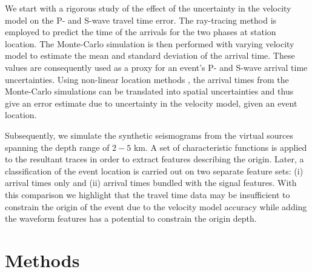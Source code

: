 \documentclass[letterpaper,11pt]{article}
\begin{document}
We start with a rigorous study of the effect of the uncertainty in the velocity model on the P- and S-wave travel time error. The ray-tracing method is employed to predict the time of the arrivals for the two phases at station location. The Monte-Carlo simulation is then performed with varying velocity model to estimate the mean and standard deviation of the arrival time. These values are consequently used as a proxy for an event's P- and S-wave arrival time uncertainties. Using non-linear location methods \citep{lomax_precise_2001}, the arrival times from the Monte-Carlo simulations can be translated into spatial uncertainties and thus give an error estimate due to uncertainty in the velocity model, given an event location.

Subsequently, we simulate the synthetic seismograms from the virtual sources spanning the depth range of $2-5$ km. A set of characteristic functions is applied to the resultant traces in order to extract features describing the origin. Later, a classification of the event location is carried out on two separate feature sets: (i) arrival times only and (ii) arrival times bundled with the signal features. With this comparison we highlight that the travel time data may be insufficient to constrain the origin of the event due to the velocity model accuracy while adding the waveform features has a potential to constrain the origin depth.

\section*{Methods}
\end{document}

